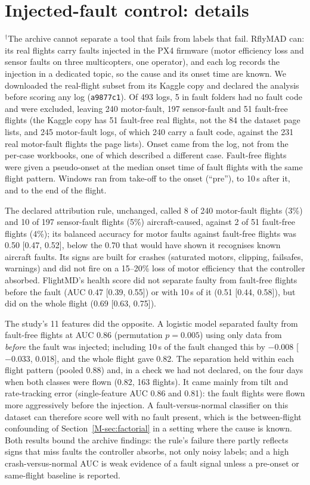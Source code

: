 \documentclass[preprint,12pt]{elsarticle}
\begin{document}
\section{Injected-fault control: details}
\label{sup:rflymad}
$^\dagger$The archive cannot separate a tool that fails from labels that fail. RflyMAD \cite{le2025rflymad} can: its real flights carry faults injected in the PX4 firmware (motor efficiency loss and sensor faults on three multicopters, one operator), and each log records the injection in a dedicated topic, so the cause and its onset time are known. We downloaded the real-flight subset from its Kaggle copy and declared the analysis before scoring any log (\texttt{a9877c1}). Of 493 logs, 5 in fault folders had no fault code and were excluded, leaving 240 motor-fault, 197 sensor-fault and 51 fault-free flights (the Kaggle copy has 51 fault-free real flights, not the 84 the dataset page lists, and 245 motor-fault logs, of which 240 carry a fault code, against the 231 real motor-fault flights the page lists). Onset came from the log, not from the per-case workbooks, one of which described a different case. Fault-free flights were given a pseudo-onset at the median onset time of fault flights with the same flight pattern. Windows ran from take-off to the onset (``pre''), to 10\,s after it, and to the end of the flight.

The declared attribution rule, unchanged, called 8 of 240 motor-fault flights (3\%) and 10 of 197 sensor-fault flights (5\%) aircraft-caused, against 2 of 51 fault-free flights (4\%); its balanced accuracy for motor faults against fault-free flights was 0.50 [0.47, 0.52], below the 0.70 that would have shown it recognises known aircraft faults. Its signs are built for crashes (saturated motors, clipping, failsafes, warnings) and did not fire on a 15--20\% loss of motor efficiency that the controller absorbed. FlightMD's health score did not separate faulty from fault-free flights before the fault (AUC 0.47 [0.39, 0.55]) or with 10\,s of it (0.51 [0.44, 0.58]), but did on the whole flight (0.69 [0.63, 0.75]).

The study's 11 features did the opposite. A logistic model separated faulty from fault-free flights at AUC 0.86 (permutation $p=0.005$) using only data from \emph{before} the fault was injected; including 10\,s of the fault changed this by $-0.008$ [$-0.033$, 0.018], and the whole flight gave 0.82. The separation held within each flight pattern (pooled 0.88) and, in a check we had not declared, on the four days when both classes were flown (0.82, 163 flights). It came mainly from tilt and rate-tracking error (single-feature AUC 0.86 and 0.81): the fault flights were flown more aggressively before the injection. A fault-versus-normal classifier on this dataset can therefore score well with no fault present, which is the between-flight confounding of Section~\ref{M-sec:factorial} in a setting where the cause is known. Both results bound the archive findings: the rule's failure there partly reflects signs that miss faults the controller absorbs, not only noisy labels; and a high crash-versus-normal AUC is weak evidence of a fault signal unless a pre-onset or same-flight baseline is reported.
\end{document}
